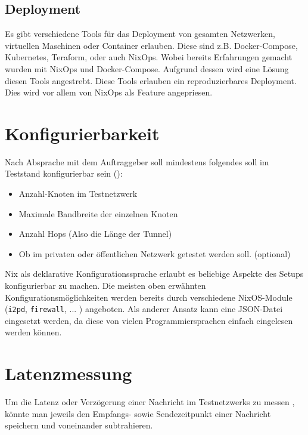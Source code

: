 \subsection{Deployment}


Es gibt verschiedene Tools für das Deployment von gesamten Netzwerken, virtuellen Maschinen oder Container erlauben. 
Diese sind z.B. Docker-Compose, Kubernetes, Teraform, oder auch NixOps.
Wobei bereits Erfahrungen gemacht wurden mit NixOps und Docker-Compose.
Aufgrund dessen wird eine Lösung diesen Tools angestrebt.
Diese Tools erlauben ein reproduzierbares Deployment.
Dies wird vor allem von NixOps als Feature angepriesen.

\section{Konfigurierbarkeit}

Nach Absprache mit dem Auftraggeber soll mindestens folgendes soll im Teststand konfigurierbar sein ():

\begin{itemize}
    \item Anzahl-Knoten im Testnetzwerk
    \item Maximale Bandbreite der einzelnen Knoten
    \item Anzahl Hops (Also die Länge der Tunnel)
    \item Ob im privaten oder öffentlichen Netzwerk getestet werden soll. (optional)
\end{itemize}

Nix als deklarative Konfigurationssprache erlaubt es beliebige Aspekte des Setups konfigurierbar zu machen.
Die meisten oben erwähnten Konfigurationsmöglichkeiten werden bereits durch verschiedene NixOS-Module (\lstinline|i2pd|, \lstinline|firewall|, ... ) angeboten.
Als anderer Ansatz kann eine JSON-Datei eingesetzt werden, da diese von vielen Programmiersprachen einfach eingelesen werden können.

\section{Latenzmessung}

Um die Latenz oder Verzögerung einer Nachricht im Testnetzwerks zu messen , könnte man jeweils den Empfangs- sowie Sendezeitpunkt einer Nachricht speichern und voneinander subtrahieren.

